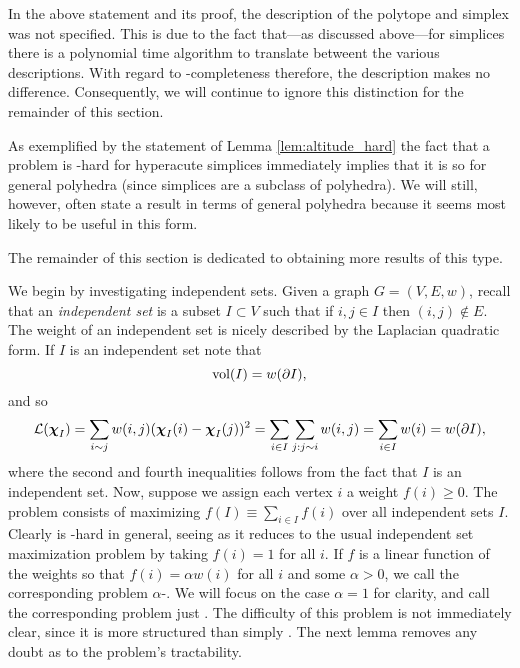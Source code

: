 \begin{remark} In  the above statement and its proof, the description of the polytope and simplex was not specified. This is due to the fact that---as discussed above---for simplices there is a polynomial time algorithm to translate betweent the various descriptions. With regard to \NP-completeness therefore, the description makes no difference. Consequently, we will continue to ignore this distinction for the remainder of this section. 
\end{remark}

\begin{remark}
	As exemplified by the statement of Lemma \ref{lem:altitude_hard} the fact that a problem is \NP-hard for hyperacute simplices immediately implies that it is so for general polyhedra (since simplices are a subclass of polyhedra). We will still, however, often state a result in terms of general polyhedra because it seems most likely to be useful in this form. 
\end{remark}

The remainder of this section is dedicated to obtaining more results of this type. 

We begin by investigating independent sets. Given a graph $G=(V,E,w)$, recall that an \emph{independent set} is a subset $I\subset V$ such that if $i,j\in I$ then $(i,j)\notin E$. 
The weight of an independent set is nicely described by the Laplacian quadratic form. If $I$ is an independent set note that 
\[\textnormal{vol}(I) = w(\partial I),\] 
and so 
\begin{align*}
    \mathcal{L}(\boldsymbol{\chi}_I) = \sum_{i\sim j}w(i,j)(\boldsymbol{\chi}_I(i)-\boldsymbol{\chi}_I(j))^2 = \sum_{i\in I}\sum_{j:j\sim i} w(i,j) = \sum_{i\in I}w(i)=w(\partial I),
\end{align*}
where the second and fourth inequalities follows from the fact that $I$ is an independent set. Now, suppose we assign each vertex $i$ a weight $f(i)\geq 0$. The \mwis problem consists of maximizing $f(I)\equiv \sum_{i\in I}f(i)$ over all independent sets $I$. Clearly \mwis is \NP-hard in general, seeing as it reduces to the usual independent set maximization problem by taking $f(i)=1$ for all $i$. If $f$ is a linear function of the weights so that $f(i)=\alpha w(i)$ for all $i$ and some $\alpha> 0$, we call the corresponding problem $\alpha$-\vwis. We will focus on the case $\alpha=1$ for clarity, and call the  corresponding problem just \vwis. The difficulty of this problem is not immediately clear, since it is more structured than simply \mwis. The next lemma removes any doubt as to the problem's tractability.   

